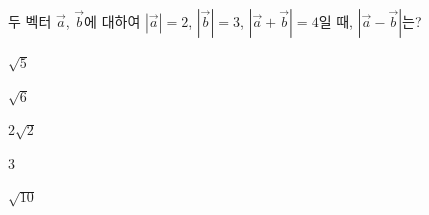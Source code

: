 두 벡터 $\vec{a}$, $\vec{b}$에 대하여 $|\vec{a}|=2$, $|\vec{b}|=3$, $|\vec{a}+\vec{b}|=4$일 때, $|\vec{a}-\vec{b}|$는?
\begin{choices32}{\rule[-3ex]{0pt}{8ex}$\sqrt{5}$}{\rule[-3ex]{0pt}{8ex}$\sqrt{6}$}{\rule[-3ex]{0pt}{8ex}$2\sqrt{2}$}{\rule[-3ex]{0pt}{8ex}$3$}{\rule[-3ex]{0pt}{8ex}$\sqrt{10}$}\end{choices32}
